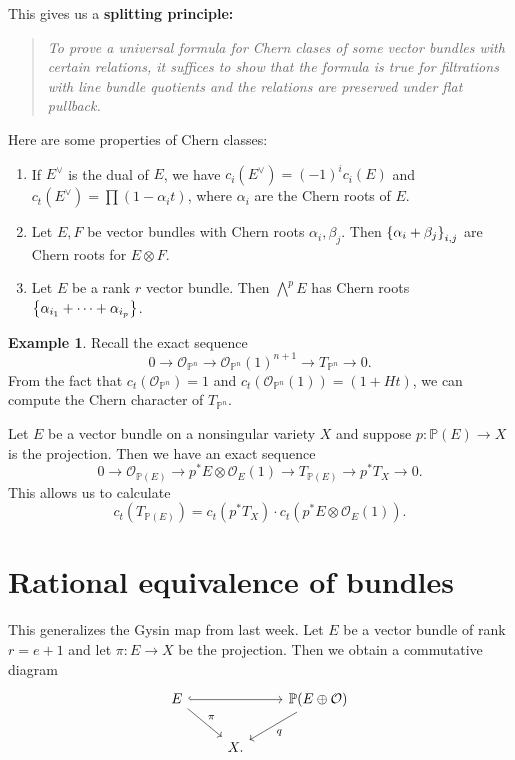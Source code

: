 \documentclass[leqno, openany]{memoir}
\theoremstyle{definition}
\newtheorem{exm}[thm]{Example}
\theoremstyle{remark}
\theoremstyle{plain}
\theoremstyle{definition}
\theoremstyle{remark}
\renewcommand{\P}{\mathbb{P}}
\newcommand{\mc}[1]{\mathcal{#1}}
\begin{document}
This gives us a \textbf{splitting principle:} \begin{quotation} \textit{To
    prove a universal formula for Chern clases of some vector bundles with
certain relations, it suffices to show that the formula is true for filtrations
with line bundle quotients and the relations are preserved under flat
pullback.} \end{quotation} Here are some properties of Chern classes:
\begin{enumerate} \item If $E^{\vee}$ is the dual of $E$, we have
    $c_i(E^{\vee}) = {(-1)}^i c_i(E)$ and $c_t(E^{\vee}) = \prod (1 - \alpha_i
    t)$, where $\alpha_i$ are the Chern roots of $E$.  \item Let $E, F$ be
    vector bundles with Chern roots $\alpha_i, \beta_j$. Then $\qty{\alpha_i +
    \beta_j}_{i,j}$ are Chern roots for $E \otimes F$.  \item Let $E$ be a rank
    $r$ vector bundle. Then $\bigwedge^p E$ has Chern roots $\qty{\alpha_{i_1}
    + \cdots + \alpha_{i_p}}$.  \end{enumerate}

\begin{exm} Recall the exact sequence \[ 0 \to \mc{O}_{\P^n} \to
\mc{O}_{\P^n}(1)^{n+1} \to T_{\P^n} \to 0. \] From the fact that
$c_t(\mc{O}_{\P^n}) = 1$ and $c_t(\mc{O}_{\P^n}(1)) = (1+H t)$, we can compute
the Chern character of $T_{\P^n}$.  \end{exm}

Let $E$ be a vector bundle on a nonsingular variety $X$ and suppose $p \colon
\P(E) \to X$ is the projection. Then we have an exact sequence \[ 0 \to
\mc{O}_{\P(E)} \to p^* E \otimes \mc{O}_E(1) \to T_{\P(E)} \to p^* T_X \to 0.
\] This allows us to calculate \[ c_t(T_{\P(E)}) = c_t(p^* T_X) \cdot c_t(p^*E
\otimes \mc{O}_E(1)). \]

\section{Rational equivalence of bundles}%
\label{sec:rational_equivalence_of_bundles}

This generalizes the Gysin map from last week. Let $E$ be a vector bundle of
rank $r = e+1$ and let $\pi \colon E \to X$ be the projection. Then we obtain a
commutative diagram \begin{equation*} \begin{tikzcd} E \ar[hookrightarrow]{rr}
    \ar{dr}{\pi} & & \P(E \oplus \mc{O}) \ar{dl}{q} \\ & X.  \end{tikzcd}
\end{equation*}
\end{document}

